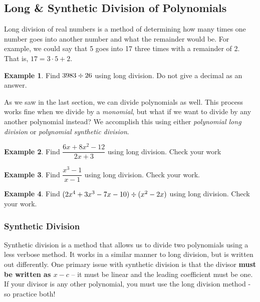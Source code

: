 \documentclass[addpoints,12pt]{exam}
\theoremstyle{definition}
\theoremstyle{break}
\theoremstyle{break}
\newtheorem{example}{Example}[subsection]
\begin{document}
\setcounter{section}{5}
\setcounter{subsection}{5}

\subsection{Long \& Synthetic Division of Polynomials}

\vspace{.15in}

Long division of real numbers is a method of determining how many times one number goes into another number and what the remainder would be. For example, we could say that 5 goes into 17 three times with a remainder of 2. That is, $17 = 3\cdot 5 + 2$.

\begin{example}
Find $3983 \divisionsymbol 26$ using long division. Do not give a decimal as an answer.
\vspace{2in}
\end{example}

As we saw in the last section, we can divide polynomials as well. This process works fine when we divide by a \emph{monomial}, but what if we want to divide by any another polynomial instead? We accomplish this using either \emph{polynomial long division} or \emph{polynomial synthetic division}.
\vspace{.15in}
\begin{example}
Find $\dfrac{6x+8x^2-12}{2x+3}$ using long division. Check your work
\end{example}


\newpage

\begin{example}
Find $\dfrac{x^3-1}{x-1}$ using long division. Check your work.
\vspace{3in}
\end{example}

\begin{example}
Find $(2x^4 + 3x^3 - 7x - 10)\divisionsymbol (x^2-2x)$ using long division. Check your work.
\end{example}

\newpage

\subsubsection*{Synthetic Division}
Synthetic division is a method that allows us to divide two polynomials using a less verbose method. It works in a similar manner to long division, but is written out differently. One primary issue with synthetic division is that the divisor \textbf{must be written as $x-c$} -- it must be linear and the leading coefficient must be one. If your divisor is any other polynomial, you must use the long division method - so practice both!
\vspace{.15in}
\end{document}
